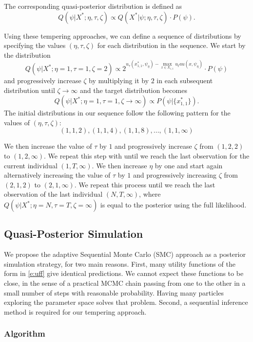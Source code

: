 \documentclass[12pt]{article}
\newcounter{thm}[section]
\begin{document}
The corresponding quasi-posterior distribution is defined as
$$ Q(\psi|X^*;\eta,\tau,\zeta) \propto Q(X^*|\psi;\eta,\tau,\zeta) \cdot P(\psi) .$$

Using these tempering approaches, we can define a sequence of distributions by specifying the values $(\eta,\tau,\zeta)$ for each distribution in the sequence. We start by the distribution 
$$Q(\psi|X^*;\eta=1,\tau=1,\zeta=2) \propto 2^{ u_\tau(x_{1,1}^*,\psi_\eta) - \max_{x \in X_{1,1}} u_tau(x,\psi_\eta)} \cdot P(\psi)$$ 
and progressively increase $\zeta$ by multiplying it by $2$ in each subsequent distribution until $\zeta \to \infty$ and the target distribution becomes
$$ Q(\psi|X^*;\eta=1,\tau=1,\zeta \to \infty) \propto  P(\psi|\{x_{1,1}^*\}).$$
The initial distributions in our sequence follow the following pattern for the values of $(\eta,\tau,\zeta)$:
$$(1,1,2),(1,1,4),(1,1,8),...,(1,1,\infty) $$

We then increase the value of $\tau$ by $1$ and progressively increase $\zeta$ from $(1,2,2)$ to $(1,2,\infty)$. We repeat this step with until we reach the last observation for the current individual $(1,T,\infty)$. We then increase $\eta$ by one and start again alternatively increasing the value of $\tau$ by $1$ and progressively increasing $\zeta$ from $(2,1,2)$ to $(2,1,\infty)$. We repeat this process until we reach the last observation of the last individual $(N,T,\infty)$, where $Q(\psi|X^*;\eta=N,\tau=T,\zeta=\infty)$ is equal to the posterior using the full likelihood.


\subsection{Quasi-Posterior Simulation}

We propose the adaptive Sequential Monte Carlo (SMC) approach \citep{DurhamGeweke2014adaptive} as a posterior simulation strategy, for two main reasons.
First, many utility functions of the form in \eqref{e:uff} give identical predictions.
We cannot expect these functions to be close, in the sense of a practical MCMC chain passing from one to the other in a small number of steps with reasonable probability. Having many particles exploring the parameter space solves that problem.
Second, a sequential inference method is required for our tempering approach.


\subsubsection{Algorithm}
\end{document}
